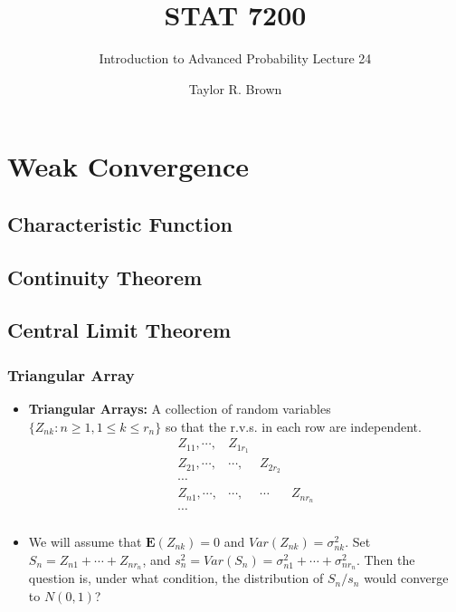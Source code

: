\documentclass[handout]{beamer}
\title{STAT 7200}
\subtitle{Introduction to Advanced Probability \newline Lecture 24}
\author{Taylor R. Brown}
\institute{}
\date{}
\newcommand{\BE}{\mathbf{E}}
\begin{document}
\frame{\titlepage}


\section[Outline]{}
\frame{\tableofcontents}

\section{Weak Convergence}


\subsection{Characteristic Function}
\subsection{Continuity Theorem} 
\subsection{Central Limit Theorem}
 
  
     \frame
{
  \frametitle{Triangular Array}
   \begin{itemize}


\item<1->\textbf{Triangular Arrays:} A collection of random variables $\{Z_{nk}: n\geq 1, 1\leq k \leq r_n\}$ so that the r.v.s. in each row are independent. 
$$\begin{array}{llll}
Z_{11},\cdots, & Z_{1r_1} & \\
Z_{21},\cdots,  & \cdots, &  Z_{2 r_2} \\
\cdots \\
Z_{n1},\cdots,  & \cdots, & \cdots  &  Z_{n r_n} \\
\cdots \\
\end{array}$$
\item<3-> We will assume that $\BE(Z_{nk})=0$ and $Var(Z_{nk}) =\sigma_{nk}^2$. Set $S_n=Z_{n1}+\cdots+Z_{nr_n}$, and $s_n^2=Var(S_{n})=\sigma^2_{n1}+\cdots+\sigma^2_{nr_n}$. Then the question is, under what condition, the distribution of $S_n/s_n$ would converge to $N(0,1)$? 

\end{itemize}
 }
 
\end{document}
